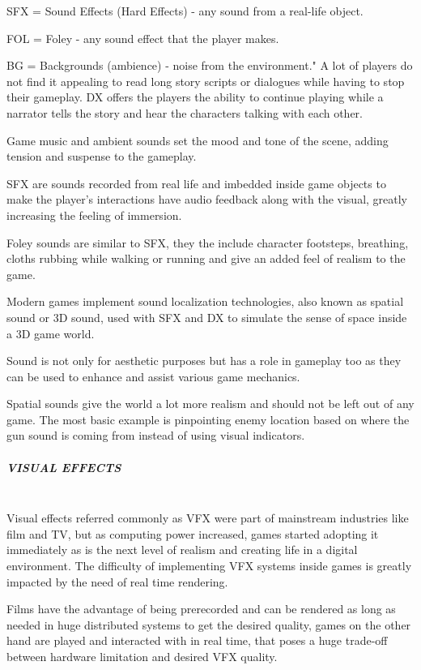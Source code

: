 \documentclass[a4paper,one side,12pt]{book}
\begin{document}
SFX = Sound Effects (Hard Effects) - any sound from a real-life
object.

 FOL = Foley - any sound effect that the player makes.

 BG = Backgrounds (ambience) - noise from the environment."
A lot of players do not find it appealing to read long story scripts or
dialogues while having to stop their gameplay. DX offers the players the
ability to continue playing while a narrator tells the story and hear
the characters talking with each other.

Game music and ambient sounds set the mood and tone of the scene, adding
tension and suspense to the gameplay.

SFX are sounds recorded from real life and imbedded inside game objects
to make the player's interactions have audio feedback
along with the visual, greatly increasing the feeling of immersion.

Foley sounds are similar to SFX, they the include character footsteps,
breathing, cloths rubbing while walking or running and give an added
feel of realism to the game.

Modern games implement sound localization technologies, also known as
spatial sound or 3D sound, used with SFX and DX to simulate the sense of
space inside a 3D game world.

Sound is not only for aesthetic purposes but has a role in gameplay too
as they can be used to enhance and assist various game mechanics.

Spatial sounds give the world a lot more realism and should not be left
out of any game. The most basic example is pinpointing enemy location
based on where the gun sound is coming from instead of using visual
indicators.


\subparagraph{VISUAL EFFECTS\\\\}

Visual effects referred commonly as VFX were part of mainstream
industries like film and TV, but as computing power increased, games
started adopting it immediately as is the next level of realism and
creating life in a digital environment. The difficulty of implementing
VFX systems inside games is greatly impacted by the need of real time
rendering.

Films have the advantage of being prerecorded and can be rendered as
long as needed in huge distributed systems to get the desired quality,
games on the other hand are played and interacted with in real time,
that poses a huge trade-off between hardware limitation and desired VFX
quality.
\end{document}
